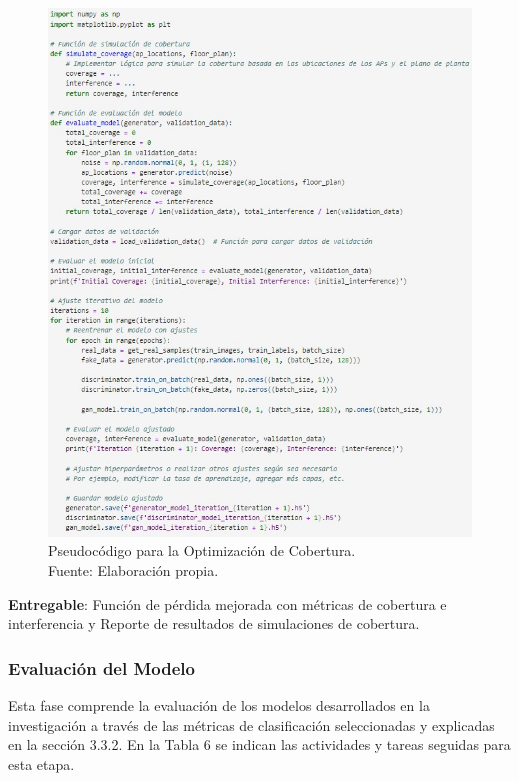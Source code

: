 \begin{figure}[H]
	\centering
	\includegraphics[width=1\textwidth]{3/figures/pseudo_cobert.jpg}
	\caption[Pseudocódigo para la Optimización de Cobertura]{Pseudocódigo para la Optimización de Cobertura.\\ Fuente: Elaboración propia.}
	\label{3:9}
\end{figure}

\textbf{Entregable}: Función de pérdida mejorada con métricas de cobertura e interferencia y Reporte de resultados de simulaciones de cobertura.

\subsubsection{Evaluación del Modelo}
Esta fase comprende la evaluación de los modelos desarrollados en la investigación a través de las métricas de clasificación seleccionadas y explicadas en la sección 3.3.2. En la Tabla 6 se indican las actividades y tareas seguidas para esta etapa.

